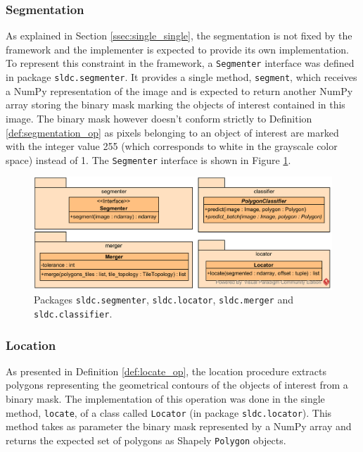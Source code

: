 \subsubsection{Segmentation}
As explained in Section \ref{ssec:single_single}, the segmentation is not fixed by the framework and the implementer is expected to provide its own implementation. To represent this constraint in the framework, a \texttt{Segmenter} interface was defined in package \texttt{sldc.segmenter}. It provides a single method, \texttt{segment}, which receives a NumPy representation of the image and is expected to return another NumPy array storing the binary mask marking the objects of interest contained in this image. The binary mask however doesn't conform strictly to Definition \ref{def:segmentation_op} as pixels belonging to an object of interest are marked with the integer value 255 (which corresponds to white in the grayscale color space) instead of 1. The \texttt{Segmenter} interface is shown in Figure \ref{fig:uml_pack_seg_merg_loc_classif}.

\begin{figure}
	\center 
	\includegraphics[scale=0.95]{image/uml_seg_merg_loc_classif.png}
	\caption{Packages \texttt{sldc.segmenter}, \texttt{sldc.locator}, \texttt{sldc.merger} and \texttt{sldc.classifier}.}
	\label{fig:uml_pack_seg_merg_loc_classif}
\end{figure}

\subsubsection{Location}
As presented in Definition \ref{def:locate_op}, the location procedure extracts polygons representing the geometrical contours of the objects of interest from a binary mask. The implementation of this operation was done in the single method, \texttt{locate}, of a class called \texttt{Locator} (in package \texttt{sldc.locator}). This method takes as parameter the binary mask represented by a NumPy array and returns the expected set of polygons as Shapely \texttt{Polygon} objects.
 
